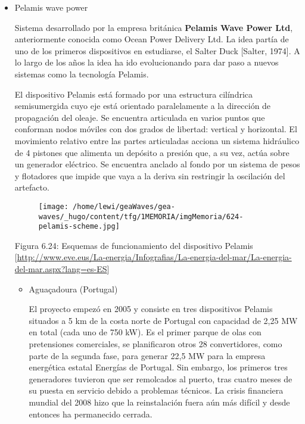 \documentclass[]{article}
\begin{document}
\begin{itemize}
\item
  Pelamis wave power

  Sistema desarrollado por la empresa británica \textbf{Pelamis Wave
  Power Ltd}, anteriormente conocida como Ocean Power Delivery Ltd. La
  idea partía de uno de los primeros dispositivos en estudiarse, el
  Salter Duck {[}Salter, 1974{]}. A lo largo de los años la idea ha ido
  evolucionando para dar paso a nuevos sistemas como la tecnología
  Pelamis.

  El dispositivo Pelamis está formado por una estructura cilíndrica
  semisumergida cuyo eje está orientado paralelamente a la dirección de
  propagación del oleaje. Se encuentra articulada en varios puntos que
  conforman nodos móviles con dos grados de libertad: vertical y
  horizontal. El movimiento relativo entre las partes articuladas
  acciona un sistema hidráulico de 4 pistones que alimenta un depósito a
  presión que, a su vez, actúa sobre un generador eléctrico. Se
  encuentra anclado al fondo por un sistema de pesos y flotadores que
  impide que vaya a la deriva sin restringir la oscilación del
  artefacto.

  \begin{figure}
  \centering
  \texttt{[image: /home/lewi/geaWaves/gea-waves/\_hugo/content/tfg/1MEMORIA/imgMemoria/624-pelamis-scheme.jpg]}
  \caption{}
  \end{figure}

  Figura 6.24: Esquemas de funcionamiento del dispositivo Pelamis
  {[}\url{http://www.eve.eus/La-energia/Infografias/La-energia-del-mar/La-energia-del-mar.aspx?lang=es-ES}{]}

  \begin{itemize}
  \item
    Aguaçadoura (Portugal)

    El proyecto empezó en 2005 y consiste en tres dispositivos Pelamis
    situados a 5 km de la costa norte de Portugal con capacidad de 2,25
    MW en total (cada uno de 750 kW). Es el primer parque de olas con
    pretensiones comerciales, se planificaron otros 28 convertidores,
    como parte de la segunda fase, para generar 22,5 MW para la empresa
    energética estatal Energías de Portugal. Sin embargo, los primeros
    tres generadores tuvieron que ser remolcados al puerto, tras cuatro
    meses de su puesta en servicio debido a problemas técnicos. La
    crisis financiera mundial del 2008 hizo que la reinstalación fuera
    aún más difícil y desde entonces ha permanecido cerrada.


\end{itemize}
\end{itemize}
\end{document}
